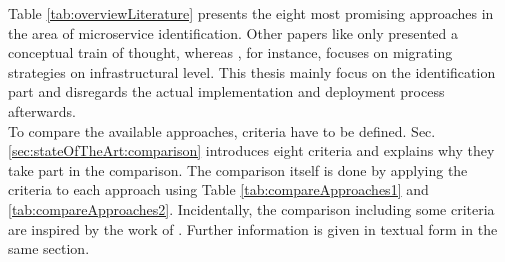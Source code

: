 \noindent
Table \ref{tab:overviewLiterature} presents the eight most promising approaches in the area of microservice identification. Other papers like \cite{TowardsCloudGuiseppe} only presented a conceptual train of thought, whereas \cite{MigratingCloud}, for instance, focuses on migrating strategies on infrastructural level. This thesis mainly focus on the identification part and disregards the actual implementation and deployment process afterwards. \\
To compare the available approaches, criteria have to be defined. Sec.\ref{sec:stateOfTheArt:comparison} introduces eight criteria and explains why they take part in the comparison. The comparison itself is done by applying the criteria to each approach using Table \ref{tab:compareApproaches1} and \ref{tab:compareApproaches2}. Incidentally, the comparison including some criteria are inspired by the work of \cite{ClassificationOfRefactoring}.
Further information is given in textual form in the same section. 





